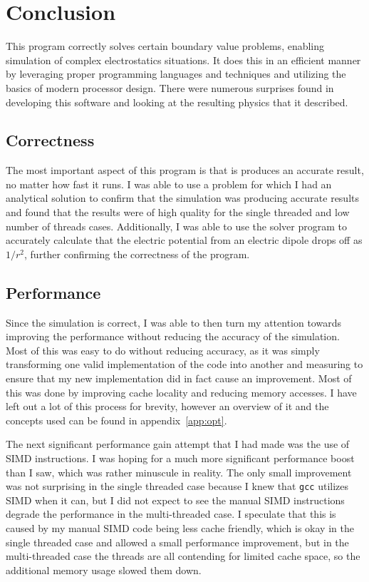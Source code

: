 \section{Conclusion}

This program correctly solves certain boundary value problems, enabling simulation
of complex electrostatics situations. It does this in an efficient manner by leveraging
proper programming languages and techniques and utilizing the basics of modern processor
design. There were numerous surprises found in developing this software and looking at
the resulting physics that it described.

\subsection{Correctness}

The most important aspect of this program is that is produces an accurate result, no
matter how fast it runs. I was able to use a problem for which I had an analytical
solution to confirm that the simulation was producing accurate results and found that
the results were of high quality for the single threaded and low number of threads
cases. Additionally, I was able to use the solver program to accurately calculate
that the electric potential from an electric dipole drops off as $1/r^2$, further
confirming the correctness of the program.


\subsection{Performance}

Since the simulation is correct, I was able to then turn my attention towards improving
the performance without reducing the accuracy of the simulation. Most of this was easy to
do without reducing accuracy, as it was simply transforming one valid implementation of
the code into another and measuring to ensure that my new implementation did in fact
cause an improvement. Most of this was done by improving cache locality and reducing
memory accesses. I have left out a lot of this process for brevity, however an overview
of it and the concepts used can be found in appendix~\ref{app:opt}.

The next significant performance gain attempt that I had made was the use of SIMD instructions.
I was hoping for a much more significant performance boost than I saw, which was rather
minuscule in reality. The only small improvement was not surprising in the single threaded
case because I knew that \texttt{gcc} utilizes SIMD when it can, but I did not expect to see
the manual SIMD instructions degrade the performance in the multi-threaded case. I speculate
that this is caused by my manual SIMD code being less cache friendly, which is okay in the
single threaded case and allowed a small performance improvement, but in the multi-threaded case
the threads are all contending for limited cache space, so the additional memory usage slowed
them down.

